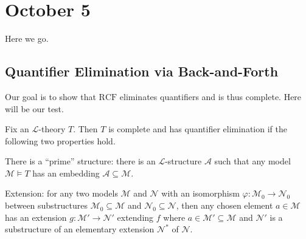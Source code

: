 \documentclass[../notes.tex]{subfiles}
\begin{document}
\section{October 5}

Here we go.

\subsection{Quantifier Elimination via Back-and-Forth}
Our goal is to show that $\mathrm{RCF}$ eliminates quantifiers and is thus complete. Here will be our test.
\begin{proposition} \label{prop:worse-get-quant-elim}
	Fix an $\mathcal L$-theory $T$. Then $T$ is complete and has quantifier elimination if the following two properties hold.
	\begin{listroman}
		\item There is a ``prime'' structure: there is an $\mathcal L$-structure $\mathcal A$ such that any model $\mathcal M\models T$ has an embedding $\mathcal A\subseteq\mathcal M$.
		\item Extension: for any two models $\mathcal M$ and $\mathcal N$ with an isomorphism $\varphi\colon\mathcal M_0\to\mathcal N_0$ between substructures $\mathcal M_0\subseteq\mathcal M$ and $\mathcal N_0\subseteq\mathcal N$, then any chosen element $a\in\mathcal M$ has an extension $g\colon\mathcal M'\to\mathcal N'$ extending $f$ where $a\in\mathcal M'\subseteq\mathcal M$ and $\mathcal N'$ is a substructure of an elementary extension $\mathcal N^*$ of $\mathcal N$.
	\end{listroman}
\end{proposition}
\end{document}
